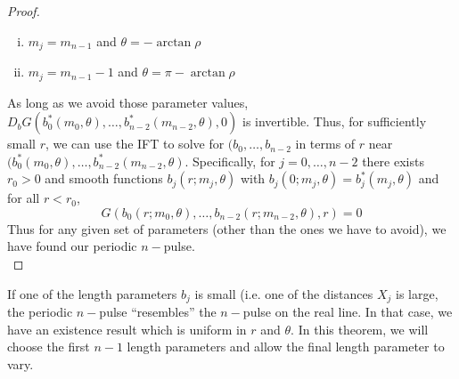 \documentclass[thesis.tex]{subfiles}
\begin{document}
\begin{theorem}
\begin{proof}
\begin{enumerate}[(i)]
\item $m_j = m_{n-1}$ and $\theta = -\arctan \rho$
\item $m_j = m_{n-1} - 1$ and $\theta = \pi-\arctan \rho$
\end{enumerate}

As long as we avoid those parameter values, $D_b G(b_0^*(m_0, \theta), \dots, b_{n-2}^*(m_{n-2}, \theta), 0)$ is invertible. Thus, for sufficiently small $r$, we can use the IFT to solve for $(b_0,\dots,b_{n-2}$ in terms of $r$ near $(b_0^*(m_0, \theta), \dots, b_{n-2}^*(m_{n-2}, \theta)$. Specifically, for $j = 0, \dots, n-2$ there exists $r_0 > 0$ and smooth functions $b_j(r; m_j, \theta)$ with $b_j(0; m_j, \theta) = b_j^*(m_j, \theta)$ and for all $r < r_0$, 
\[
G(b_0(r; m_0, \theta), \dots, b_{n-2}(r; m_{n-2}, \theta), r) = 0
\]
Thus for any given set of parameters (other than the ones we have to avoid), we have found our periodic $n-$pulse.\\

\end{proof}
\end{theorem}

If one of the length parameters $b_j$ is small (i.e. one of the distances $X_j$ is large, the periodic $n-$pulse ``resembles'' the $n-$pulse on the real line. In that case, we have an existence result which is uniform in $r$ and $\theta$. In this theorem, we will choose the first $n-1$ length parameters and allow the final length parameter to vary.

\end{document}
